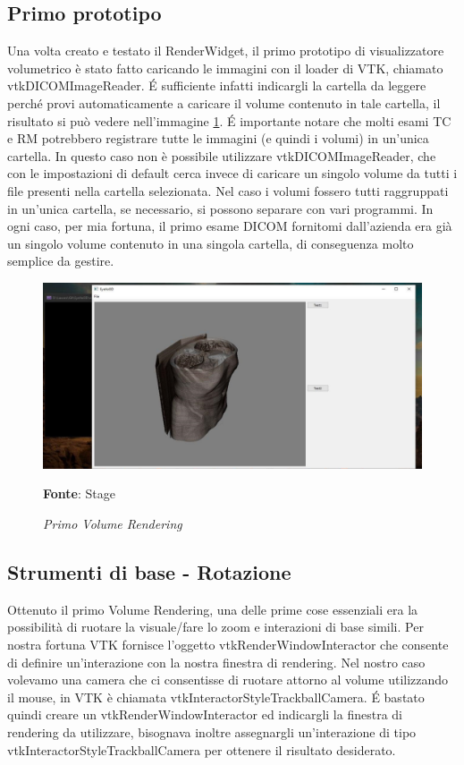 \subsection{Primo prototipo}
Una volta creato e testato il RenderWidget, il primo prototipo di visualizzatore volumetrico è stato fatto caricando le immagini con il loader di VTK, chiamato vtkDICOMImageReader. \'E sufficiente infatti indicargli la cartella da leggere perché provi automaticamente a caricare il volume contenuto in tale cartella, il risultato si può vedere nell'immagine \ref{fig: firstvolume}. \'E importante notare che molti esami TC e RM potrebbero registrare tutte le immagini (e quindi i volumi) in un'unica cartella. In questo caso non è possibile utilizzare vtkDICOMImageReader, che con le impostazioni di default cerca invece di caricare un singolo volume da tutti i file presenti nella cartella selezionata. Nel caso i volumi fossero tutti raggruppati in un'unica cartella, se necessario, si possono separare con vari programmi. In ogni caso, per mia fortuna, il primo esame DICOM fornitomi dall'azienda era già un singolo volume contenuto in una singola cartella, di conseguenza molto semplice da gestire.

\begin{figure}[h]
    \centering
    \includegraphics[width=1\textwidth]{immagini/svolgimento/firstvolume.jpg}
    \caption{\textit{Primo Volume Rendering}}
    \textbf{Fonte}: Stage
    \label{fig: firstvolume}
\end{figure}

\subsection{Strumenti di base - Rotazione}
Ottenuto il primo Volume Rendering, una delle prime cose essenziali era la possibilità di ruotare la visuale/fare lo zoom e interazioni di base simili. Per nostra fortuna VTK fornisce l'oggetto vtkRenderWindowInteractor che consente di definire un'interazione con la nostra finestra di rendering. Nel nostro caso volevamo una camera che ci consentisse di ruotare attorno al volume utilizzando il mouse, in VTK è chiamata vtkInteractorStyleTrackballCamera. \'E bastato quindi creare un vtkRenderWindowInteractor ed indicargli la finestra di rendering da utilizzare, bisognava inoltre assegnargli un'interazione di tipo vtkInteractorStyleTrackballCamera per ottenere il risultato desiderato.

